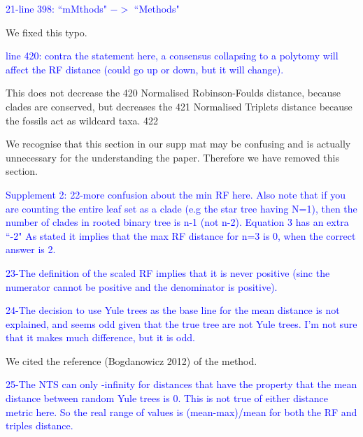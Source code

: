 \documentclass[11pt]{letter}
\begin{document}
\begin{letter}{}


\textcolor{blue}{21-line 398: ``mMthods" $->$ ``Methods"}

We fixed this typo.

\textcolor{blue}{line 420: contra the statement here, a consensus collapsing to a polytomy will affect the RF distance (could go up or down, but it will change).}


This does not decrease the 420
Normalised Robinson-Foulds distance, because clades are conserved, but decreases the 421
Normalised Triplets distance because the fossils act as wildcard taxa. 422





We recognise that this section in our supp mat may be confusing and is actually unnecessary for the understanding the paper. Therefore we have removed this section. %

\textcolor{blue}{Supplement 2:}
\textcolor{blue}{22-more confusion about the min RF here. Also note that if you are counting the entire leaf set as a clade (e.g the star tree having N=1), then the number of clades in rooted binary tree is n-1 (not n-2). Equation 3 has an extra ``-2" As stated it implies that the max RF distance for n=3 is 0, when the correct answer is 2.}



\textcolor{blue}{23-The definition of the scaled RF implies that it is never positive (sinc the numerator cannot be positive and the denominator is positive).}



\textcolor{blue}{24-The decision to use Yule trees as the base line for the mean distance is not explained, and seems odd given that the true tree are not Yule trees. I'm not sure that it makes much difference, but it is odd.}

We cited the reference (Bogdanowicz 2012) of the method.


\textcolor{blue}{25-The NTS can only -infinity for distances that have the property that the mean distance between random Yule trees is 0. This is not true of either distance metric here. So the real range of values is (mean-max)/mean for both the RF and triples distance.}


\end{letter}
\end{document}
